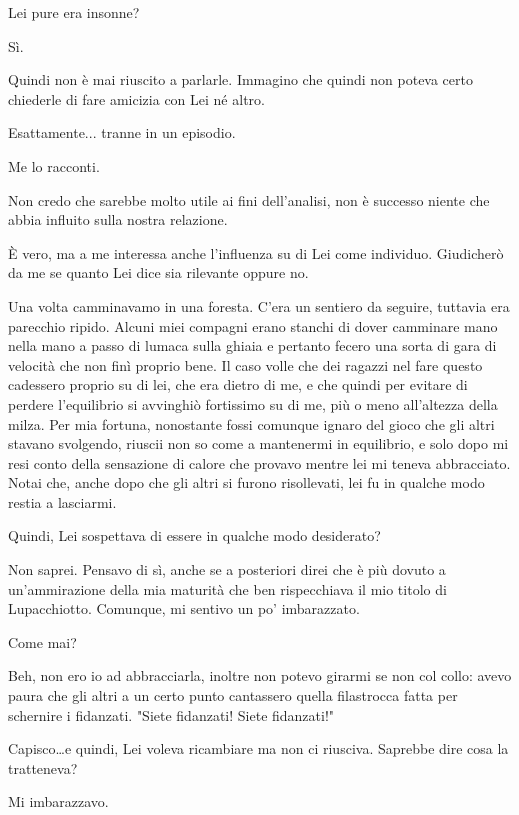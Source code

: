 \documentclass[a4paper,12pt]{article}
\newcommand{\Walter}{\speak{W}}
\newcommand{\Pollazzi}{\speak{P}}
\begin{document}
\begin{dialogue}
\Pollazzi Lei pure era insonne?

\Walter Sì.

\Pollazzi Quindi non è mai riuscito a parlarle. Immagino che quindi non poteva certo chiederle di fare amicizia con Lei né altro.

\Walter Esattamente... tranne in un episodio.

\Pollazzi Me lo racconti.

\Walter Non credo che sarebbe molto utile ai fini dell'analisi, non è successo niente che abbia influito sulla nostra relazione.

\Pollazzi È vero, ma a me interessa anche l'influenza su di Lei come individuo. Giudicherò da me se quanto Lei dice sia rilevante oppure no.

\Walter Una volta camminavamo in una foresta. C'era un sentiero da seguire, tuttavia era parecchio ripido. Alcuni miei compagni erano stanchi di dover camminare mano nella mano a passo di lumaca sulla ghiaia e pertanto fecero una sorta di gara di velocità che non finì proprio bene. Il caso volle che dei ragazzi nel fare questo cadessero proprio su di lei, che era dietro di me, e che quindi per evitare di perdere l'equilibrio si avvinghiò fortissimo su di me, più o meno all'altezza della milza. Per mia fortuna, nonostante fossi comunque ignaro del gioco che gli altri stavano svolgendo, riuscii non so come a mantenermi in equilibrio, e solo dopo mi resi conto della sensazione di calore che provavo mentre lei mi teneva abbracciato. Notai che, anche dopo che gli altri si furono risollevati, lei fu in qualche modo restia a lasciarmi.

\Pollazzi Quindi, Lei sospettava di essere in qualche modo desiderato?

\Walter Non saprei. Pensavo di sì, anche se a posteriori direi che è più dovuto a un'ammirazione della mia maturità che ben rispecchiava il mio titolo di Lupacchiotto. Comunque, mi sentivo un po' imbarazzato.

\Pollazzi Come mai?

\Walter Beh, non ero io ad abbracciarla, inoltre non potevo girarmi se non col collo: avevo paura che gli altri a un certo punto cantassero quella filastrocca fatta per schernire i fidanzati.  "Siete fidanzati! Siete fidanzati!"

\Pollazzi Capisco\ldots e quindi, Lei voleva ricambiare ma non ci riusciva.
Saprebbe dire cosa la tratteneva?

\Walter Mi imbarazzavo.


\end{dialogue}
\end{document}
